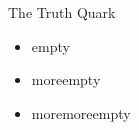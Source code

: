 \begin{frame}{The Truth Quark}
	\begin{minipage}[c][4cm]{\textwidth}
		\begin{itemize}
			\itemfill
			\item empty
			\item moreempty
			\item moremoreempty
		\end{itemize}
	\end{minipage}
\end{frame}
